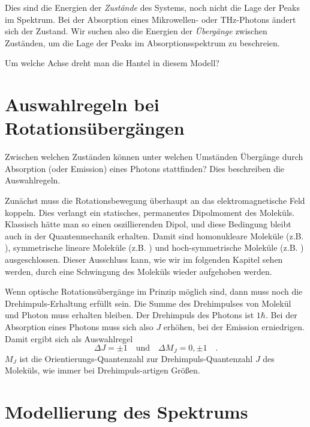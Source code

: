 Dies sind die Energien der \emph{Zustände} des Systems, noch nicht die Lage der Peaks im Spektrum. Bei der Absorption eines Mikrowellen- oder THz-Photons ändert sich der Zustand. Wir suchen also die Energien der \emph{Übergänge} zwischen Zuständen, um die Lage der Peaks im Absorptionsspektrum zu beschreien.


\begin{questions} 
\item Um welche Achse dreht man die Hantel in diesem Modell?
\end{questions}


\section{Auswahlregeln bei Rotationsübergängen}

Zwischen welchen Zuständen können unter welchen Umständen Übergänge durch Absorption (oder Emission) eines Photons stattfinden? Dies beschreiben  die Auswahlregeln.

Zunächst muss die Rotationsbewegung überhaupt an das elektromagnetische Feld koppeln. Dies verlangt  ein statisches, permanentes Dipolmoment des Moleküls. Klassisch hätte man so einen oszillierenden Dipol, und diese Bedingung bleibt auch in der Quantenmechanik erhalten. Damit sind homonukleare Moleküle (z.B. ), symmetrische lineare Moleküle (z.B. ) und hoch-symmetrische Moleküle (z.B. ) ausgeschlossen. Dieser Ausschluss kann, wie wir im folgenden Kapitel sehen werden, durch eine Schwingung des Moleküls wieder aufgehoben werden.

Wenn optische Rotationsübergänge im Prinzip möglich sind, dann muss noch die Drehimpuls-Erhaltung erfüllt sein. Die Summe des Drehimpulses von Molekül und Photon muss erhalten bleiben. Der Drehimpuls des Photons ist $1 \hbar$. Bei der Absorption eines Photons muss sich also $J$ erhöhen, bei der Emission erniedrigen. Damit ergibt sich als Auswahlregel
\begin{equation}
\Delta J = \pm 1 \quad \text{und} \quad \Delta M_J = 0, \pm 1 \quad .
\end{equation}
$M_J$ ist die Orientierungs-Quantenzahl zur Drehimpuls-Quantenzahl $J$ des Moleküls, wie immer bei Drehimpuls-artigen Größen.

\section{Modellierung des Spektrums}

